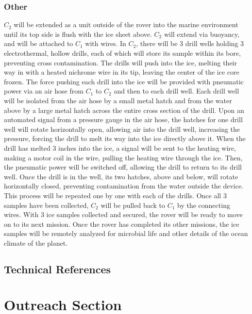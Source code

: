 \documentclass{article}
\begin{document}
\subsubsection{Other}

$C_2$ will be extended as a unit outside of the rover into the marine environment until its top side is flush with the ice sheet above. $C_2$ will extend via buoyancy, and will be attached to $C_1$ with wires. In $C_2$, there will be 3 drill wells holding 3 electrothermal, hollow drills, each of which will store its sample within its bore, preventing cross contamination. The drills will push into the ice, melting their way in with a heated nichrome wire in its tip, leaving the center of the ice core frozen. The force pushing each drill into the ice will be provided with pneumatic power via an air hose from $C_1$ to $C_2$ and then to each drill well. Each drill well will be isolated from the air hose by a small metal hatch and from the water above by a large metal hatch across the entire cross section of the drill. Upon an automated signal from a pressure gauge in the air hose, the hatches for one drill well will rotate horizontally open, allowing air into the drill well, increasing the pressure, forcing the drill to melt its way into the ice directly above it. When the drill has melted 3 inches into the ice, a signal will be sent to the heating wire, making a motor coil in the wire, pulling the heating wire through the ice. Then, the pneumatic power will be switched off, allowing the drill to return to its drill well. Once the drill is in the well, its two hatches, above and below, will rotate horizontally closed, preventing contamination from the water outside the device. This process will be repeated one by one with each of the drills. Once all 3 samples have been collected, $C_2$ will be pulled back to $C_1$ by the connecting wires. With 3 ice samples collected and secured, the rover will be ready to move on to its next mission. Once the rover has completed its other missions, the ice samples will be remotely analyzed for microbial life and other details of the ocean climate of the planet.

\subsection{Technical References}


\section{Outreach Section}
\end{document}
